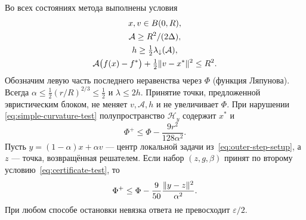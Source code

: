 \begin{lemma}\label{lem:outer-potential}
Во всех состояниях метода выполнены условия
\begin{equation}\label{eq:outer-invariant}
 \begin{gathered}
 x,v\in B(0,R),\\
 \mathcal A\ge R^2/(2\Delta),\\
 h\ge\tfrac12\lambda_\downarrow(\mathcal A),\\
 \mathcal A\bigl(f(x)-f^\ast\bigr)+\tfrac12\lVert v-x^\ast\rVert^2\le R^2.
 \end{gathered}
\end{equation}
Обозначим левую часть последнего неравенства через $\Phi$
(функция Ляпунова). Всегда $\alpha\le\frac12(r/R)^{2/3}\le\frac12$ и $\lambda\le2h$.
Принятие точки, предложенной эвристическим блоком, не меняет $v,\mathcal A,h$
и не увеличивает $\Phi$.
При нарушении \eqref{eq:simple-curvature-test} полупространство
$\mathcal H_y$ содержит $x^\ast$ и
\begin{equation}\label{eq:cut-descent}
 \Phi^+\le\Phi-\frac{9r^2}{128\alpha^2}.
\end{equation}
Пусть $y=(1-\alpha)x+\alpha v$ --- центр локальной задачи
из~\eqref{eq:outer-step-setup}, а $z$ --- точка, возвращённая решателем.
Если набор $(z,g,\beta)$ принят по второму условию~\eqref{eq:certificate-test}, то
\begin{equation}\label{eq:damped-descent}
 \Phi^+\le\Phi-\frac9{50}\frac{\lVert y-z\rVert^2}{\alpha^2}.
\end{equation}
При любом способе остановки невязка ответа не превосходит
$\varepsilon/2$.
\end{lemma}

